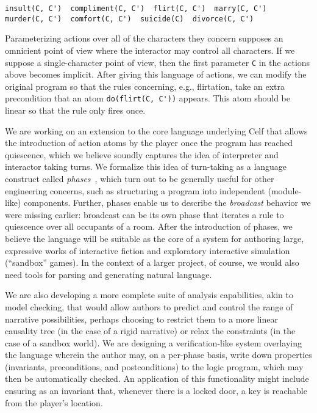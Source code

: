 \documentclass[letterpaper]{article}
\begin{document}
\begin{verbatim}
insult(C, C')  compliment(C, C')  flirt(C, C')  marry(C, C') 
murder(C, C')  comfort(C, C')  suicide(C)  divorce(C, C') 
\end{verbatim}

Parameterizing actions over all of the characters they concern supposes an
omnicient point of view where the interactor may control all characters. If
we suppose a single-character point of view, then the first parameter
\verb|C| in the actions above becomes implicit.
After giving this language of actions, we can modify the original program
so that the rules concerning, e.g., flirtation, take an extra precondition
that an atom \verb|do(flirt(C, C'))| appears. This atom should be linear so
that the rule only fires once.

We are working on an extension to the core language underlying Celf that
allows the introduction of action atoms by the player once the
program has reached quiescence, which we believe soundly captures the idea
of interpreter and interactor taking turns. We formalize this idea of
turn-taking as a language construct called {\em
phases}~\cite{Martens13:thesis-proposal}, which turn out to be generally
useful for other engineering concerns, such as structuring a program into
independent (module-like) components. Further, phases enable us to
describe the {\em broadcast} behavior we were missing earlier: broadcast
can be its own phase that iterates a rule to quiescence over all occupants
of a room.
After the introduction of phases, we believe the language will be suitable
as the core of a system for authoring large, expressive works of
interactive fiction and exploratory interactive simulation (``sandbox''
games). In the context of a larger project, of course, we would also need
tools for parsing and generating natural language.

We are also developing a more complete suite of analysis capabilities, akin
to model checking, that would allow authors to predict and control the
range of narrative possibilities, perhaps choosing to restrict them to a
more linear causality tree (in the case of a rigid narrative) or relax the
constraints (in the case of a sandbox world).  We are designing a
verification-like system overlaying the language wherein the author may, on
a per-phase basis, write down properties (invariants, preconditions, and
postconditions) to the logic program, which may then be automatically
checked. An application of this functionality might include ensuring as an
invariant that, whenever there is a locked door, a key is reachable from
the player's location.
\end{document}
